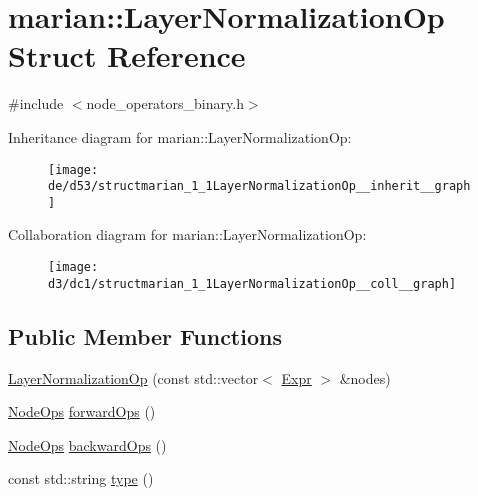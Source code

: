 \hypertarget{structmarian_1_1LayerNormalizationOp}{}\section{marian\+:\+:Layer\+Normalization\+Op Struct Reference}
\label{structmarian_1_1LayerNormalizationOp}


{\ttfamily \#include $<$node\+\_\+operators\+\_\+binary.\+h$>$}



Inheritance diagram for marian\+:\+:Layer\+Normalization\+Op\+:
\nopagebreak
\begin{figure}[H]
\begin{center}
\leavevmode
\texttt{[image: de/d53/structmarian\_1\_1LayerNormalizationOp\_\_inherit\_\_graph]}
\end{center}
\end{figure}


Collaboration diagram for marian\+:\+:Layer\+Normalization\+Op\+:
\nopagebreak
\begin{figure}[H]
\begin{center}
\leavevmode
\texttt{[image: d3/dc1/structmarian\_1\_1LayerNormalizationOp\_\_coll\_\_graph]}
\end{center}
\end{figure}
\subsection*{Public Member Functions}
\begin{DoxyCompactItemize}
\item 
\hyperlink{structmarian_1_1LayerNormalizationOp_a924c6c6c68f93e09234f3bc08c1d4958}{Layer\+Normalization\+Op} (const std\+::vector$<$ \hyperlink{namespacemarian_a498d8baf75b754011078b890b39c8e12}{Expr} $>$ \&nodes)
\item 
\hyperlink{namespacemarian_a4956376218cc236016c20bc4071470da}{Node\+Ops} \hyperlink{structmarian_1_1LayerNormalizationOp_aaad6bcd73ad2c58582ec90b1e9da9887}{forward\+Ops} ()
\item 
\hyperlink{namespacemarian_a4956376218cc236016c20bc4071470da}{Node\+Ops} \hyperlink{structmarian_1_1LayerNormalizationOp_a31596fee029ef32402528e24376e2c69}{backward\+Ops} ()
\item 
const std\+::string \hyperlink{structmarian_1_1LayerNormalizationOp_a4181e34fd584d36ffb6397feb1c2ef51}{type} ()
\end{DoxyCompactItemize}

